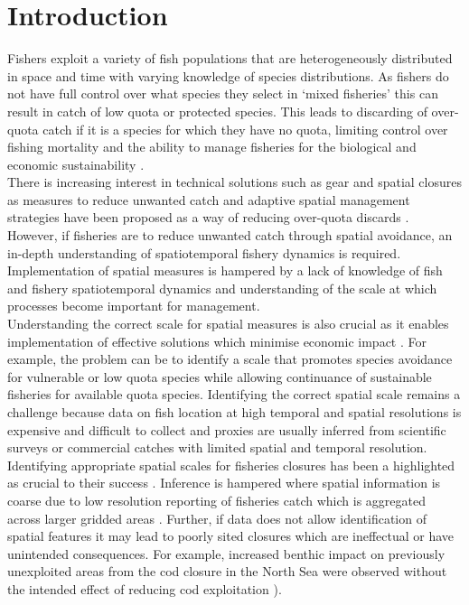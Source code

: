 \documentclass[review]{elsarticle}
\begin{document}
\linenumbers

\section{Introduction}

Fishers exploit a variety of fish populations that are heterogeneously
distributed in space and time with varying knowledge of species distributions.
As fishers do not have full control over what species they select in `mixed
fisheries' this can result in catch of low quota or protected species. This
leads to discarding of over-quota catch if it is a species for which they have
no quota, limiting control over fishing mortality \citep{Alverson1994,
	Crowder1998, Rijnsdorp2007} and the ability to manage fisheries for the
biological and economic sustainability \citep{Ulrich2011a, Batsleer2015}.\\

There is increasing interest in technical solutions such as gear and spatial
closures as measures to reduce unwanted catch \citep{Kennelly2002,
	Catchpole2008, Bellido2011, Cosgrove2019} and adaptive spatial
management strategies have been proposed as a way of reducing over-quota
discards \citep{Holmes2011, Little2014, Dunn2014a}. However, if fisheries are
to reduce unwanted catch through spatial avoidance, an in-depth understanding
of spatiotemporal fishery dynamics is required. Implementation of spatial
measures is hampered by a lack of knowledge of fish and fishery spatiotemporal
dynamics and understanding of the scale at which processes become important for
management. \\

Understanding the correct scale for spatial measures is also crucial as it
enables implementation of effective solutions which minimise economic impact
\citep{Dunn2016}. For example, the problem can be to identify a scale that
promotes species avoidance for vulnerable or low quota species while allowing
continuance of sustainable fisheries for available quota species. Identifying
the correct spatial scale remains a challenge because data on fish location at
high temporal and spatial resolutions is expensive and difficult to collect and
proxies are usually inferred from scientific surveys or commercial catches with
limited spatial and temporal resolution. \\ 

Identifying appropriate spatial scales for fisheries closures has been a
highlighted as crucial to their success \citep{Costello2010, Dunn2016}.
Inference is hampered where spatial information is coarse due to low resolution
reporting of fisheries catch which is aggregated across larger gridded areas
\citep{Branch2005}. Further, if data does not allow identification of spatial
features it may lead to poorly sited closures which are ineffectual or have
unintended consequences. For example, increased benthic impact on previously
unexploited areas from the cod closure in the North Sea were observed without
the intended effect of reducing cod exploitation
\citep{Rijnsdorp2001,Dinmore2003}).\\ 
\end{document}
